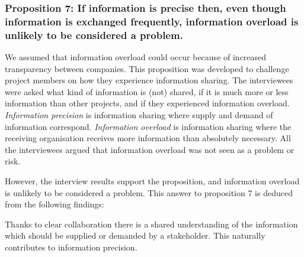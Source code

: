 
\subsubsection{Proposition 7: If information is precise then, even though information is exchanged frequently, information overload is unlikely to be considered a problem.}

We assumed that information overload could occur because of increased transparency between companies. This proposition was developed to challenge project members on how they experience information sharing. The interviewees were asked what kind of information is (not) shared, if it is much more or less information than other projects, and if they experienced information overload. {\em Information precision} is information sharing where supply and demand of information correspond. {\em Information overload} is information sharing where the receiving organisation receives more information than absolutely necessary. All the interviewees argued that information overload was not seen as a problem or risk.

However, the interview results support the proposition, and information overload is unlikely to be considered a problem. This answer to proposition 7 is deduced from the following findings:

 Thanks to clear collaboration there is a shared understanding of the information which should be supplied or demanded by a stakeholder. This naturally contributes to information precision.



